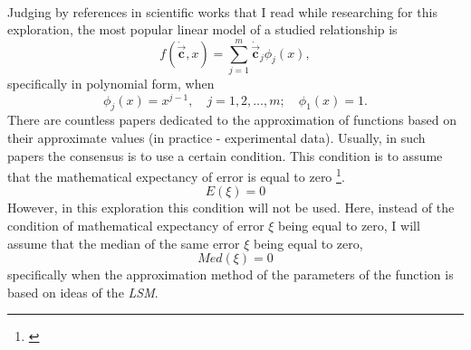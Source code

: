 \documentclass[11pt,a4paper]{article}
\numberwithin{equation}{subsection}
\newcommand{\vecc}{\vec{\textbf{c}}}
\begin{document}
\\
Judging by references in scientific works that I read while researching for this exploration, the most popular linear model of a studied relationship is
\begin{equation}
f(\dot{\vecc},x)= \sum\limits_{j=1}^{m} \dot{\vecc}_{j} \phi_{j}(x), \label{functionform}
\end{equation}
specifically in polynomial form, when
\begin{equation}
\phi_{j}(x)=x^{j-1},\quad j=1,2,\dots,m; \quad \phi_{1}(x) = 1.
\end{equation}
There are countless papers dedicated to the approximation of functions based on their approximate values (in practice - experimental data). Usually, in such papers the consensus is to use a certain condition. This condition is to assume that the mathematical expectancy of error is equal to zero \footnote{\cite{Plackett_1950}}.
\begin{equation}
E(\xi)=0
\end{equation}
 However, in this exploration this condition will not be used. Here, instead of the condition of mathematical expectancy of error $\xi$ being equal to zero, I will assume that the median of the same error $\xi$ being equal to zero, 
\begin{equation}
Med(\xi)=0
\end{equation}
specifically when the approximation method of the parameters of the function is based on ideas of the \textit{LSM}. \\
\end{document}
